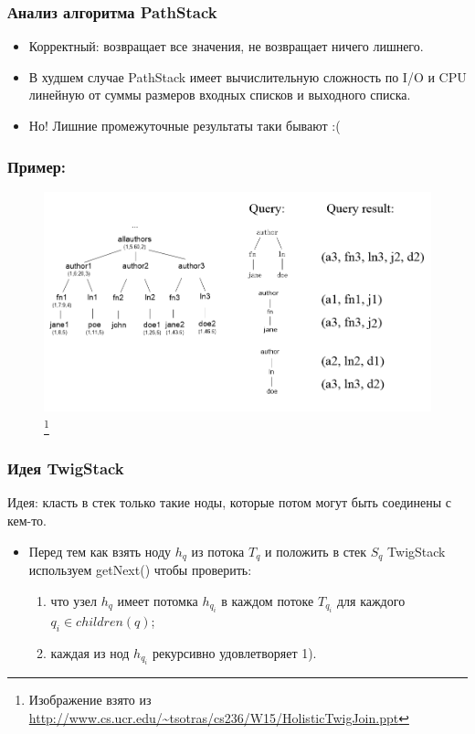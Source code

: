 \documentclass{beamer}
\begin{document}
\begin{frame}
\frametitle{Анализ алгоритма PathStack}

\begin{itemize}
  \setlength\itemsep{1em}
  \item Корректный: возвращает все значения, не возвращает ничего лишнего.
  \item В худшем случае PathStack имеет вычислительную сложность по I/O и CPU линейную от суммы размеров входных списков и выходного списка.
  \item \alert{Но! Лишние промежуточные результаты таки бывают :(}
\end{itemize}
\end{frame}

\begin{frame}
\frametitle{Пример:}

\begin{figure}[htb]
\includegraphics[width=\textwidth,height=0.85\textheight,keepaspectratio]{xmlalg-twigstack1.png} 
\footnote{\tiny{Изображение взято из \url{http://www.cs.ucr.edu/~tsotras/cs236/W15/HolisticTwigJoin.ppt}}}
\end{figure}    

\end{frame}

\begin{frame}
\frametitle{Идея TwigStack}

Идея: класть в стек только такие ноды, которые потом могут быть соединены с кем-то. 

\begin{itemize}
  \setlength\itemsep{1em}
  \item Перед тем как взять ноду $h_q$ из потока $T_q$ и положить в стек $S_q$ TwigStack используем getNext() чтобы проверить:
  \begin{enumerate}
    \setlength\itemsep{1em}
  
     \item что узел $h_q$ имеет потомка $h_{q_i}$ в каждом потоке $T_{q_i}$ для каждого $q_i \in children(q)$;
     \item каждая из нод $h_{q_i}$ рекурсивно удовлетворяет 1).
  \end{enumerate}

\end{itemize}
\end{frame}
\end{document}
